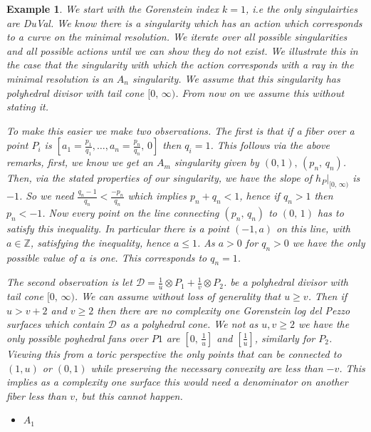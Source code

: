 \documentclass[11pt]{amsart}
\theoremstyle{plain}
\newtheorem{ex}[thm]{Example}
\newcommand{\mb}[1]{\mathbb{#1}}
\begin{document}
\begin{ex}\rm

We start with the Gorenstein index $k = 1$, i.e the only singulairties are DuVal. We know there is a singularity which has an action which corresponds to a curve on the minimal resolution. We iterate over all possible singularities and all possible actions until we can show they do not exist. We illustrate this in the case that the singularity with which the action corresponds with a ray in the minimal resolution is an $A_n$ singularity. We assume that this singularity has polyhedral divisor with tail cone $[ 0, \, \infty)$. From now on we assume this without stating it.

To make this easier we make two observations. The first is that if a fiber over a point $P_i$ is $[a_1 = \frac{p_1}{q_1} , \dots, a_n = \frac{p_n}{q_n}, \, 0]$ then $q_i = 1$. This follows via the above remarks, first, we know we get an $A_m$ singularity given by $(0, 1), \, (p_n,  \, q_n)$. Then, via the stated properties of our singularity, we have the slope of $h_P|_{[0, \, \infty)}$ is $-1$. So we need $\frac{q_n-1}{q_n} < \frac{-p_n}{q_n}$ which implies $p_n + q_n < 1$, hence if $q_n > 1$ then $p_n < -1$. Now every point on the line connecting $(p_n, \, q_n)$ to $(0, \, 1)$ has to satisfy this inequality. In particular there is a point $(-1, a)$ on this line, with $a  \in \mb{Z}$, satisfying the inequality, hence $ a \leq 1$. As $ a>0$ for $q_n>0$ we have the only possible value of $a$ is one. This corresponds to $q_n = 1$.


The second observation is let $\mathcal{D} = \frac{1}{u} \otimes P_1 + \frac{1}{v} \otimes P_2$. be a polyhedral divisor with tail cone $[ 0 , \, \infty)$. We can assume without loss of generality that $u \geq v$. Then if $u>v+2$ and $v \geq 2$ then there are no complexity one Gorenstein log del Pezzo surfaces which contain $\mathcal{D}$ as a polyhedral cone. We not as $u,  v \geq 2$ we have the only possible poyhedral fans over $P1$ are $[0, \, \frac{1}{u}
]$ and $[\frac{1}{u}]$, similarly for $P_2$. Viewing this from a toric perspective the only points that can be connected to $(1,u)$ or $(0,1)$ while preserving the necessary convexity are less than $-v$. This implies as a complexity one surface this would need a denominator on another fiber less than $v$, but this cannot happen. 

\begin{itemize}

\item  $A_1$


\end{itemize}
\end{ex}
\end{document}

